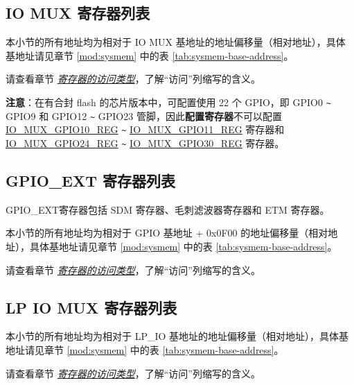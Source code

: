 \documentclass[main\_\_CN.tex]{subfiles}
\begin{document}
\label{section:4.12}




\subsection{IO MUX 寄存器列表}
本小节的所有地址均为相对于 IO MUX 基地址的地址偏移量（相对地址），具体基地址请见章节 \ref{mod:sysmem} \textit{} 中的表 \ref{tab:sysmem-base-address}。

请查看章节 \hyperref[glossary-access-types]{\textit{寄存器的访问类型}}，了解“访问”列缩写的含义。

\textbf{注意}：在有合封 flash 的芯片版本中，可配置使用 22 个 GPIO，即 GPIO0 \verb+~+ GPIO9 和 GPIO12 \verb+~+ GPIO23 管脚，因此\textbf{配置寄存器}不可以配置 \hyperref[regdesc:IOMUXGPIONREG]{IO\_MUX\_GPIO10\_REG} \verb+~+ \hyperref[regdesc:IOMUXGPIONREG]{IO\_MUX\_GPIO11\_REG} 寄存器和 \hyperref[regdesc:IOMUXGPIONREG]{IO\_MUX\_GPIO24\_REG} \verb+~+ \hyperref[regdesc:IOMUXGPIONREG]{IO\_MUX\_GPIO30\_REG} 寄存器。



\subsection{GPIO\_EXT 寄存器列表}

GPIO\_EXT寄存器包括 SDM 寄存器、毛刺滤波器寄存器和 ETM 寄存器。

本小节的所有地址均为相对于 GPIO 基地址 + 0x0F00 的地址偏移量（相对地址），具体基地址请见章节 \ref{mod:sysmem} \textit{} 中的表 \ref{tab:sysmem-base-address}。

请查看章节 \hyperref[glossary-access-types]{\textit{寄存器的访问类型}}，了解“访问”列缩写的含义。




\subsection{LP IO MUX 寄存器列表}
本小节的所有地址均为相对于 LP\_IO 基地址的地址偏移量（相对地址），具体基地址请见章节 \ref{mod:sysmem} \textit{} 中的表 \ref{tab:sysmem-base-address}。

请查看章节 \hyperref[glossary-access-types]{\textit{寄存器的访问类型}}，了解“访问”列缩写的含义。


\end{document}
